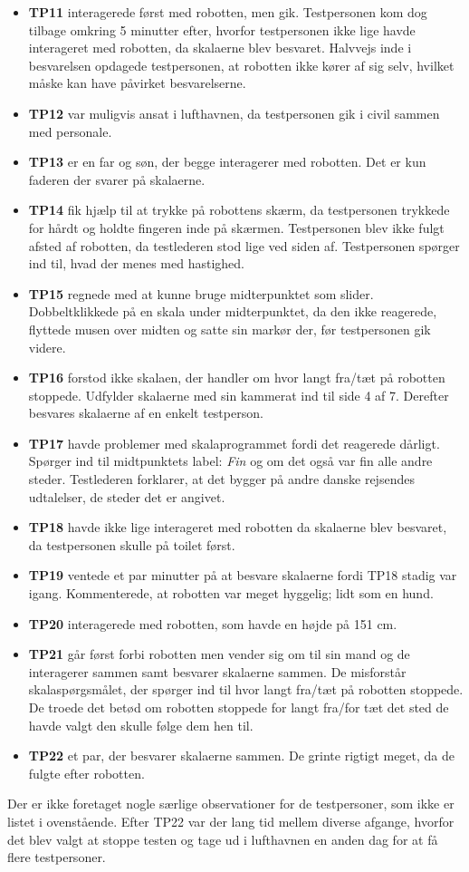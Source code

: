 \begin{itemize}
\item \textbf{TP11} interagerede først med robotten, men gik. Testpersonen kom dog tilbage omkring 5 minutter efter, hvorfor testpersonen ikke lige havde interageret med robotten, da skalaerne blev besvaret. Halvvejs inde i besvarelsen opdagede testpersonen, at robotten ikke kører af sig selv, hvilket måske kan have påvirket besvarelserne.
\item \textbf{TP12} var muligvis ansat i lufthavnen, da testpersonen gik i civil sammen med personale.
\item \textbf{TP13} er en far og søn, der begge interagerer med robotten. Det er kun faderen der svarer på skalaerne.
\item \textbf{TP14} fik hjælp til at trykke på robottens skærm, da testpersonen trykkede for hårdt og holdte fingeren inde på skærmen. Testpersonen blev ikke fulgt afsted af robotten, da testlederen stod lige ved siden af. Testpersonen spørger ind til, hvad der menes med hastighed.
\item \textbf{TP15} regnede med at kunne bruge midterpunktet som slider. Dobbeltklikkede på en skala under midterpunktet, da den ikke reagerede, flyttede musen over midten og satte sin markør der, før testpersonen gik videre.
\item \textbf{TP16} forstod ikke skalaen, der handler om hvor langt fra/tæt på robotten stoppede. Udfylder skalaerne med sin kammerat ind til side 4 af 7. Derefter besvares skalaerne af en enkelt testperson.
\item \textbf{TP17} havde problemer med skalaprogrammet fordi det reagerede dårligt. Spørger ind til midtpunktets label: \textit{Fin} og om det også var fin alle andre steder. Testlederen forklarer, at det bygger på andre danske rejsendes udtalelser, de steder det er angivet.
\item \textbf{TP18} havde ikke lige interageret med robotten da skalaerne blev besvaret, da testpersonen skulle på toilet først.
\item \textbf{TP19} ventede et par minutter på at besvare skalaerne fordi TP18 stadig var igang. Kommenterede, at robotten var meget hyggelig; lidt som en hund.
\item \textbf{TP20} interagerede med robotten, som havde en højde på 151 cm.
\item \textbf{TP21} går først forbi robotten men vender sig om til sin mand og de interagerer sammen samt besvarer skalaerne sammen. De misforstår skalaspørgsmålet, der spørger ind til hvor langt fra/tæt på robotten stoppede. De troede det betød om robotten stoppede for langt fra/for tæt det sted de havde valgt den skulle følge dem hen til.
\item \textbf{TP22} et par, der besvarer skalaerne sammen. De grinte rigtigt meget, da de fulgte efter robotten.\blankline
\end{itemize}
\noindent
%
Der er ikke foretaget nogle særlige observationer for de testpersoner, som ikke er listet i ovenstående. Efter TP22 var der lang tid mellem diverse afgange, hvorfor det blev valgt at stoppe testen og tage ud i lufthavnen en anden dag for at få flere testpersoner. 

